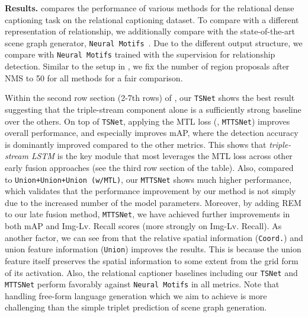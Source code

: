 \noindent\textbf{Results.}
 compares the performance of {various methods for} the relational dense captioning task on {the} relational captioning dataset. 
{To compare with a different representation of relationship,} we additionally compare with the state-of-the-art scene graph generator, \texttt{Neural Motifs}~\cite{zellers2018neural}.
Due to the different output structure, we compare with \texttt{Neural Motifs} trained with the supervision for relationship detection.
Similar to the setup in \cite{johnson2016densecap}, we fix the number of region proposals after NMS to 50 for all methods for a fair comparison.

Within the second row section (2-7th rows) of , our \texttt{TSNet} shows the best result suggesting that the triple-stream component alone is a sufficiently strong baseline over the others.
On top of \texttt{TSNet}, applying the MTL loss (\ie, \texttt{MTTSNet}) improves overall performance, and especially improves mAP, where the detection accuracy is
dominantly improved compared to 
the other metrics.
This shows that \emph{triple-stream LSTM} is the key module that most leverages the MTL loss across other early fusion approaches (see the third {row section} of the table).
{Also, compared to \texttt{Union+Union+Union~(w/MTL)}, our \texttt{MTTSNet} shows much higher performance, which validates that the performance improvement by our method is not simply due to the increased number of the model parameters.}
Moreover, by adding REM to our late fusion method, \texttt{MTTSNet}, we have achieved further improvements in both mAP and Img-Lv. 
Recall scores (more strongly on Img-Lv. Recall).
As another factor, {we can see from  that the relative spatial information (\texttt{Coord.}) and union feature information (\texttt{Union}) improves the results.} 
This is because 
the union feature itself preserves the spatial information to some extent from the  grid form of its activation. 
Also, the relational captioner baselines including our \texttt{TSNet} and \texttt{MTTSNet} perform favorably against \texttt{Neural Motifs} in all metrics.
Note that handling free-form language generation which we aim to achieve is more challenging than the simple triplet prediction of scene graph generation.




















